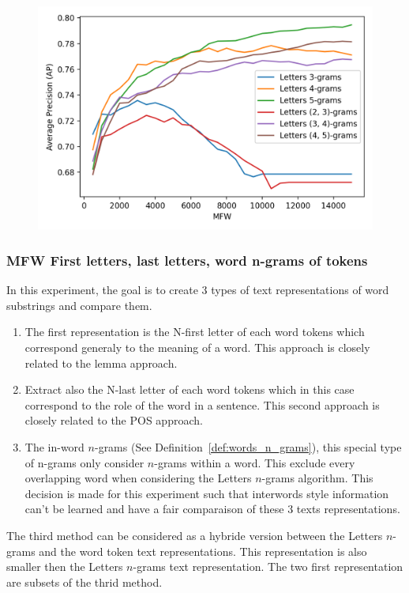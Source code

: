 \begin{figure}
  \label{fig:letter_ngrams_st_jean}
  \includegraphics[width=\linewidth]{img/letter_ngrams_st_jean.png}
\end{figure}

\subsubsection{MFW First letters, last letters, word n-grams of tokens}

In this experiment, the goal is to create 3 types of text representations of word substrings and compare them.

\begin{enumerate}
  \item
  The first representation is the N-first letter of each word tokens which correspond generaly to the meaning of a word.
  This approach is closely related to the lemma approach.
  \item
  Extract also the N-last letter of each word tokens which in this case correspond to the role of the word in a sentence.
  This second approach is closely related to the POS approach.
  \item
  The in-word $n$-grams (See Definition~\ref{def:words_n_grams}), this special type of n-grams only consider $n$-grams within a word.
  This exclude every overlapping word when considering the Letters $n$-grams algorithm.
  This decision is made for this experiment such that interwords style information can't be learned and have a fair comparaison of these 3 texts representations.
\end{enumerate}
The third method can be considered as a hybride version between the Letters $n$-grams and the word token text representations.
This representation is also smaller then the Letters $n$-grams text representation.
The two first representation are subsets of the thrid method.


